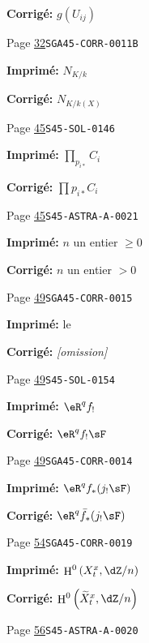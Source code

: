 \documentclass[oneside]{book}
\DeclareMathOperator{\h}{H}
\theoremstyle{sga-source}
\theoremstyle{sga-source-dash}
\theoremstyle{sga-source-dotdash}
\theoremstyle{sga-source-number-note-dash}
\theoremstyle{sga-source-note-number-dotdash}
\theoremstyle{sga-source-example-dotdash}
\theoremstyle{sga-source-inline-number}
\theoremstyle{sga-source-bare-number}
\theoremstyle{sga-source}
\begin{document}
\begin{description}
\par\noindent\textbf{Corrigé:} \(g(U_{i j})\)
\smallskip
\item[\hypertarget{apparatus:FR-0017}{17}] Page \hyperlink{printpage:fr:32}{32}\quad\texttt{SGA45-CORR-0011B}
\par\noindent\textbf{Imprimé:} \(N_{K/k}\)
\par\noindent\textbf{Corrigé:} \(N_{K/k(X)}\)
\smallskip
\item[\hypertarget{apparatus:FR-0018}{18}] Page \hyperlink{printpage:fr:45}{45}\quad\texttt{S45-SOL-0146}
\par\noindent\textbf{Imprimé:} \(\prod_{p_{i*}} C_i\)
\par\noindent\textbf{Corrigé:} \(\prod p_{i*} C_i\)
\smallskip
\item[\hypertarget{apparatus:FR-0019}{19}] Page \hyperlink{printpage:fr:45}{45}\quad\texttt{S45-ASTRA-A-0021}
\par\noindent\textbf{Imprimé:} $n$ un entier $\geqslant 0$
\par\noindent\textbf{Corrigé:} $n$ un entier $>0$
\smallskip
\item[\hypertarget{apparatus:FR-0020}{20}] Page \hyperlink{printpage:fr:49}{49}\quad\texttt{SGA45-CORR-0015}
\par\noindent\textbf{Imprimé:} le 
\par\noindent\textbf{Corrigé:} \emph{\textnormal{[omission]}}
\smallskip
\item[\hypertarget{apparatus:FR-0021}{21}] Page \hyperlink{printpage:fr:49}{49}\quad\texttt{S45-SOL-0154}
\par\noindent\textbf{Imprimé:} \(\eR^q f_!\)
\par\noindent\textbf{Corrigé:} \(\eR^q f_! \sF\)
\smallskip
\item[\hypertarget{apparatus:FR-0022}{22}] Page \hyperlink{printpage:fr:49}{49}\quad\texttt{SGA45-CORR-0014}
\par\noindent\textbf{Imprimé:} \(\eR^q f_*(j_! \sF)\)
\par\noindent\textbf{Corrigé:} \(\eR^q \bar f_*(j_! \sF)\)
\smallskip
\item[\hypertarget{apparatus:FR-0023}{23}] Page \hyperlink{printpage:fr:54}{54}\quad\texttt{SGA45-CORR-0019}
\par\noindent\textbf{Imprimé:} \(\h^0\left(X_t^x,\dZ/n\right)\)
\par\noindent\textbf{Corrigé:} \(\h^0\left(\widetilde X_t^x,\dZ/n\right)\)
\smallskip
\item[\hypertarget{apparatus:FR-0024}{24}] Page \hyperlink{printpage:fr:56}{56}\quad\texttt{S45-ASTRA-A-0020}

\end{description}
\end{document}
